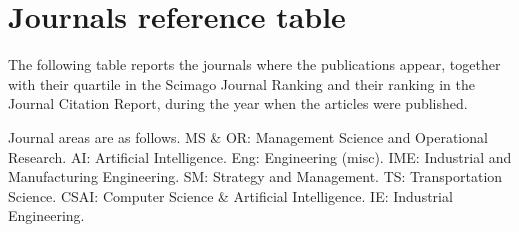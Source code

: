 \section*{Journals reference table}

The following table reports the journals where the publications appear, together with their quartile in the Scimago Journal Ranking and their ranking in the Journal Citation Report, during the year when the articles were published.

Journal areas are as follows.
MS \& OR: Management Science and Operational Research.
AI: Artificial Intelligence.
Eng: Engineering (misc).
IME: Industrial and Manufacturing Engineering.
SM: Strategy and Management.
TS: Transportation Science.
CSAI: Computer Science \& Artificial Intelligence.
IE: Industrial Engineering.

